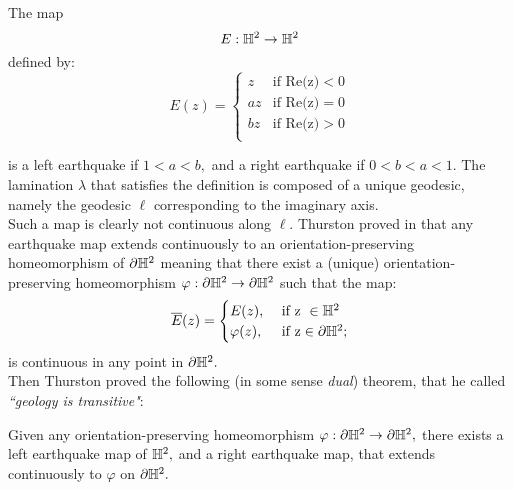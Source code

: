 \begin{example}\label{simplequake}
The map 
\[
    E:\mathbb{H}^2\to\mathbb{H}^2
\]
defined by:
\[
  E(z)= \begin{cases}
    z & \text{if Re(z)}<0 \\
    az & \text{if Re(z)}=0 \\
    bz & \text{if Re(z)}>0 \\    
\end{cases}
\]

is a left earthquake if $1<a<b,$ and a right earthquake if $0<b<a<1$. The lamination $\lambda$ that satisfies the definition is composed of a unique geodesic, namely the geodesic $\ell$ corresponding to the imaginary axis. \\
Such a map is clearly not continuous along $\ell$.
Thurston proved in \cite{thurston1986earthquakes} that any earthquake map extends continuously to an orientation-preserving homeomorphism of $\partial\mathbb{H}^2$ meaning that there exist a (unique) orientation-preserving homeomorphism $\varphi:\partial\mathbb{H}^2\to\partial\mathbb{H}^2$ such that the map:
\[
    \overline{E}(z)=\begin{cases}
        E(z), &\text{ if z }\in \mathbb{H}^2\\
        \varphi(z), &\text{ if z}\in \partial\mathbb{H}^2  ;\\
        
    \end{cases}
\]
is continuous in any point in $\partial\mathbb{H}^2.$\\
Then Thurston proved the following (in some sense \textit{dual}) theorem, that he called \textit{``geology is transitive"}:

\begin{theorem}\label{earttheorem}
    Given any orientation-preserving homeomorphism $\varphi:\partial\mathbb{H}^2\to\partial\mathbb{H}^2,$ there exists a left earthquake map of $\mathbb{H}^2,$ and a right earthquake map, that extends continuously to $\varphi$ on $\partial\mathbb{H}^2.$
\end{theorem}
\end{example}

